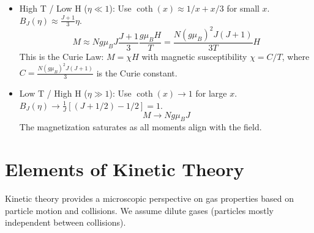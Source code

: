 \documentclass[10pt, letterpaper]{article}
\begin{document}
\begin{itemize}
    \item High T / Low H ($\eta \ll 1$): Use $\coth(x) \approx 1/x + x/3$ for small $x$.
          $B_J(\eta) \approx \frac{J+1}{3} \eta$.
          \begin{equation*}
              M \approx N g \mu_B J \frac{J+1}{3} \frac{g \mu_B H}{T} = \frac{N (g \mu_B)^2 J(J+1)}{3T} H
          \end{equation*}
          This is the Curie Law: $M = \chi H$ with magnetic susceptibility $\chi = C/T$, where $C = \frac{N (g \mu_B)^2 J(J+1)}{3}$ is the Curie constant.
    \item Low T / High H ($\eta \gg 1$): Use $\coth(x) \to 1$ for large $x$.
          $B_J(\eta) \to \frac{1}{J} [ (J+1/2) - 1/2 ] = 1$.
          \begin{equation*}
              M \to N g \mu_B J
          \end{equation*}
          The magnetization saturates as all moments align with the field.
\end{itemize}

\section{Elements of Kinetic Theory}
Kinetic theory provides a microscopic perspective on gas properties based on particle motion and collisions. We assume dilute gases (particles mostly independent between collisions).
\end{document}
